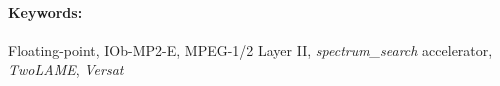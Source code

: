 \paragraph{\hspace{0.5cm} \Large{Keywords:}} Floating-point, IOb-MP2-E, MPEG-1/2 Layer II, \textit{spectrum\_search} accelerator, \textit{TwoLAME}, \textit{Versat}